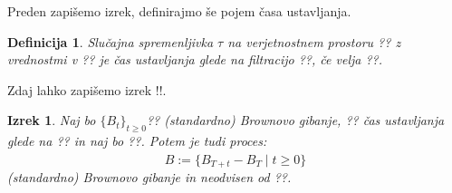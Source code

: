 \documentclass[a4paper,11pt]{article}
\newtheorem{izrek}{Izrek}
\newtheorem{definicija}{Definicija}
\begin{document}
Preden zapišemo izrek, definirajmo še pojem časa ustavljanja.


\begin{definicija}
    Slučajna spremenljivka $\tau$ na verjetnostnem prostoru ?? z vrednostmi v ??
    je čas ustavljanja glede na filtracijo ??, če velja ??.
\end{definicija}

Zdaj lahko zapišemo izrek !!. %


\begin{izrek}
    Naj bo $\{B_t\}_{t \geq 0}$?? (standardno) Brownovo gibanje, ?? čas ustavljanja glede na 
    ?? in naj bo ??.
    Potem je tudi proces:
    \[
    \hat{B} := \{B_{T+t} - B_T \mid t \geq 0\}
    \]
    (standardno) Brownovo gibanje in neodvisen od ??.
\end{izrek}
    
\end{document}
